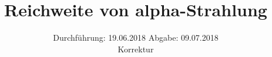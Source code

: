 

\subject{V701}
\title{Reichweite von alpha-Strahlung}
\date{%
  Durchführung: 19.06.2018
  \hspace{3em}
  Abgabe: 09.07.2018 \\
  Korrektur
}



\maketitle
\thispagestyle{empty}
\tableofcontents
\newpage






\printbibliography{}


